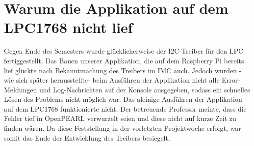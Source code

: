 \section{Warum die Applikation auf dem LPC1768 nicht lief}
Gegen Ende des Semesters wurde glücklicherweise der I2C-Treiber für den LPC fertiggestellt. Das Bauen unserer Applikation, die auf dem Raspberry Pi bereits lief glückte nach Bekanntmachung des Treibers im IMC auch. Jedoch wurden -wie sich später herausstellte- beim Ausführen der Applikation nicht alle Error-Meldungen und Log-Nachrichten auf der Konsole ausgegeben, sodass ein schnelles Lösen des Problems nicht möglich war. Das aleinige Ausführen der Applikation auf dem LPC1768 funktionierte nicht. Der betreuende Professor meinte, dass die Fehler tief in OpenPEARL verwurzelt seien und diese nicht auf kurze Zeit zu finden wären. Da diese Feststellung in der vorletzten Projektwoche erfolgt, war somit das Ende der Entwicklung des Treibers besiegelt.
